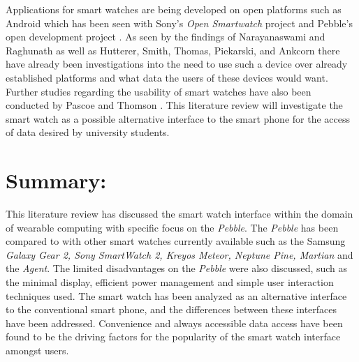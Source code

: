 \documentclass[10pt,a4paper]{article}
\begin{document}
Applications for smart watches are being developed on open platforms such as Android which has been seen with Sony’s \textit{Open  Smartwatch} project \cite{Sony} and Pebble’s open development project \cite{Pebble}.  As seen by the findings of Narayanaswami and Raghunath \cite{2000} as well as Hutterer, Smith, Thomas, Piekarski, and Ankcorn \cite{2005} there have already been investigations into the need to use such a device over already established platforms and what data the users of these devices would want.  Further studies regarding the usability of smart watches have also been conducted by Pascoe and Thomson \cite{2007}.  This literature review will investigate the smart watch as a possible alternative interface to the smart phone for the access of data desired by university students.

\section{Summary:}
This  literature  review  has  discussed  the  smart  watch  interface  within  the  domain  of wearable computing with specific focus on the \textit{Pebble}. The \textit{Pebble} has been compared to with other smart watches  currently  available  such  as  the Samsung  \textit{Galaxy  Gear  2, Sony  SmartWatch  2, Kreyos Meteor, Neptune Pine, Martian} and the \textit{Agent}. The limited disadvantages on the \textit{Pebble} were also discussed, such as the minimal display, efficient power management and simple user interaction techniques used. The smart watch has been analyzed as an alternative interface to the conventional smart phone, and the differences between these interfaces have been addressed.  Convenience and always accessible data access have been found to be the driving factors for the popularity of the smart watch interface amongst users.
\end{document}
